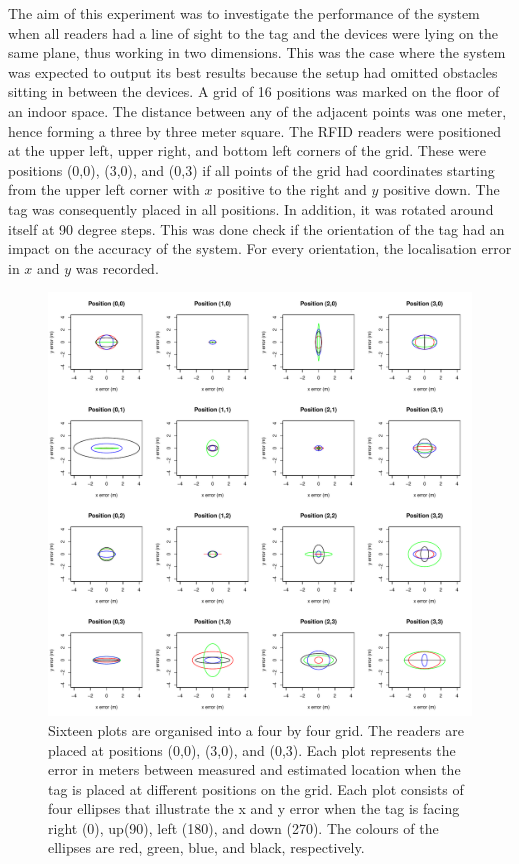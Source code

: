 The aim of this experiment was to investigate the performance of the system when all readers had a line of sight to the tag and the devices were lying on the same plane, thus working in two dimensions. This was the case where the system was expected to output its best results because the setup had omitted obstacles sitting in between the devices. A grid of 16 positions was marked on the floor of an indoor space. The distance between any of the adjacent points was one meter, hence forming a three by three meter square. The RFID readers were positioned at the upper left, upper right, and bottom left corners of the grid. These were positions (0,0), (3,0), and (0,3) if all points of the grid had coordinates starting from the upper left corner with $x$ positive to the right and $y$ positive down. The tag was consequently placed in all positions. In addition, it was rotated around itself at 90 degree steps. This was done check if the orientation of the tag had an impact on the accuracy of the system. For every orientation, the localisation error in $x$ and $y$ was recorded.
\begin{figure}[H]
	\begin{center}
		\includegraphics[width=1\textwidth]{figures/error_distance_grid}
		\caption{Sixteen plots are organised into a four by four grid. The readers are placed at positions (0,0), (3,0), and (0,3). Each plot represents the error in meters between measured and estimated location when the tag is placed at different positions on the grid. Each plot consists of four ellipses that illustrate the x and y error when the tag is facing right (0\textdegree), up(90\textdegree), left (180\textdegree), and down (270\textdegree). The colours of the ellipses are red, green, blue, and black, respectively.}
		\label{fig:errorlos}
	\end{center}
\end{figure}

